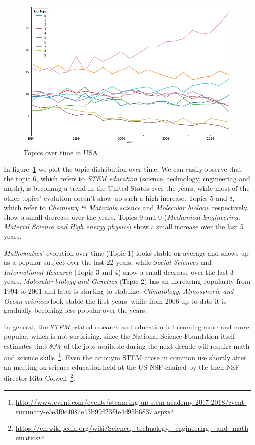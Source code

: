 \documentclass[12pt]{report}
\begin{document}
\begin{figure}[H]
\centering
\includegraphics[width=1.0\textwidth]
{figs/topic-evolution-usa.png}
\caption{Topics over time in USA}
\label{usatrend}
\end{figure}
In figure~\ref{usatrend} we plot the topic distribution over time. We can easily
observe that the topic 6, which refers to \emph{STEM education} (science, technology, engineering and math), is becoming
a trend in the United States over the years, while most of the other
topics' evolution doesn't show up such a high increase. Topics 5 and
8, which refer to \emph{Chemistry \& Materials science} and \emph{Molecular
biology}, respectively, show a small decrease over the years. Topics 9
and 0 (\emph{Mechanical Engineering, Material Science and High energy
physics}) show a small increase over the last 5 years. 

\emph{Mathematics}'
evolution over time (Topic 1) looks stable on average and shows up as
a popular subject over the last 22 years, while \emph{Social Sciences} and
\emph{International Research} (Topic 3 and 4) show a small decrease over the
last 3 years. \emph{Molecular biology and Genetics} (Topic 2) has an
increasing popularity from 1994 to 2001 and later is starting to
stabilize. \emph{Climatology, Atmospheric and Ocean sciences} look stable the
first years, while from 2006 up to date it is gradually becoming less
popular over the years.

In general, the \emph{STEM} related research and education is becoming 
more and more popular, which is not surprising, since the National 
Science Foundation itself estimates that 80\% of the jobs available 
during the next decade
will require math and science skills~\footnote{\url{http://www.cvent.com/events/steam-ing-up-stem-academy-2017-2018/event-summary-e3e3f0c4087e43b99d23f4e4d95b6837.aspx}}. Even the acronym STEM arose in common use shortly after an meeting on 
science education held at the US NSF chaired by the then 
NSF director Rita Colwell~\footnote{\url{https://en.wikipedia.org/wiki/Science,_technology,_engineering,_and_mathematics}}.
\end{document}
